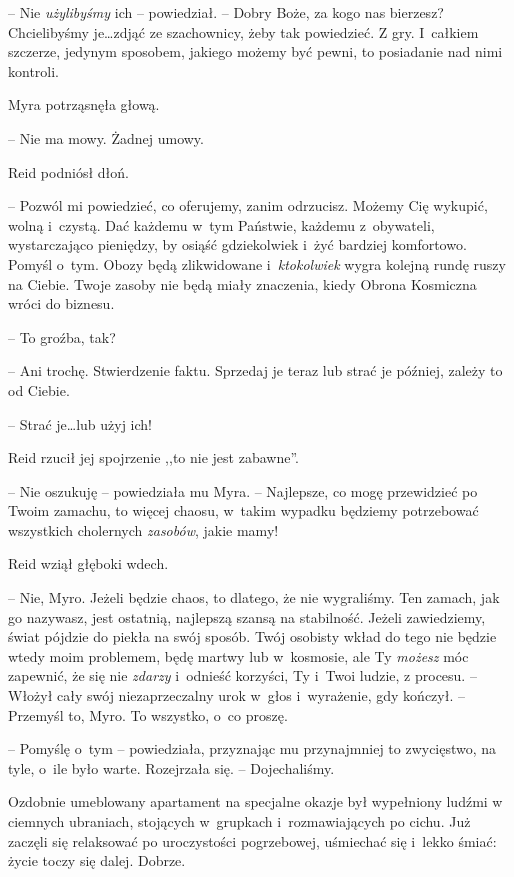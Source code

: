 \documentclass[oneside,polish,11pt,sfheadings]{mwbk}
\begin{document}
-- Nie \textit{użylibyśmy }ich -- powiedział. -- Dobry Boże, za kogo nas
bierzesz? Chcielibyśmy je\ldots zdjąć ze szachownicy, żeby tak powiedzieć.
Z gry. I~całkiem szczerze, jedynym sposobem, jakiego możemy być pewni,
to posiadanie nad nimi kontroli.

Myra potrząsnęła głową. 

-- Nie ma mowy. Żadnej umowy.

Reid podniósł dłoń. 

-- Pozwól mi powiedzieć, co oferujemy, zanim
odrzucisz. Możemy Cię wykupić, wolną i~czystą. Dać każdemu w~tym
Państwie, każdemu z~obywateli, wystarczająco pieniędzy, by osiąść
gdziekolwiek i~żyć bardziej komfortowo. Pomyśl o~tym. Obozy będą
zlikwidowane i~\textit{ktokolwiek} wygra kolejną rundę ruszy na Ciebie.
Twoje zasoby nie będą miały znaczenia, kiedy Obrona Kosmiczna wróci do
biznesu.

-- To groźba, tak?

-- Ani trochę. Stwierdzenie faktu. Sprzedaj je teraz lub strać je
później, zależy to od Ciebie.

-- Strać je\ldots lub użyj ich!

Reid rzucił jej spojrzenie ,,to nie jest zabawne''.

-- Nie oszukuję -- powiedziała mu Myra. -- Najlepsze, co mogę przewidzieć
po Twoim zamachu, to więcej chaosu, w~takim wypadku będziemy potrzebować
wszystkich cholernych \textit{zasobów}, jakie mamy!

Reid wziął głęboki wdech. 

-- Nie, Myro. Jeżeli będzie chaos, to dlatego,
że nie wygraliśmy. Ten zamach, jak go nazywasz, jest ostatnią, najlepszą
szansą na stabilność. Jeżeli zawiedziemy, świat pójdzie do piekła na
swój sposób. Twój osobisty wkład do tego nie będzie wtedy moim
problemem, będę martwy lub w~kosmosie, ale Ty \textit{możesz }móc
zapewnić, że się nie \textit{zdarzy} i~odnieść korzyści, Ty i~Twoi ludzie,
z procesu. -- Włożył cały swój niezaprzeczalny urok w~głos i~wyrażenie,
gdy kończył. -- Przemyśl to, Myro. To wszystko, o~co proszę.

-- Pomyślę o~tym -- powiedziała, przyznając mu przynajmniej to zwycięstwo,
na tyle, o~ile było warte. Rozejrzała się. -- Dojechaliśmy.

Ozdobnie umeblowany apartament na specjalne okazje był wypełniony ludźmi
w ciemnych ubraniach, stojących w~grupkach i~rozmawiających po cichu.
Już zaczęli się relaksować po uroczystości pogrzebowej, uśmiechać się i~lekko śmiać: życie toczy się dalej. Dobrze.
\end{document}

